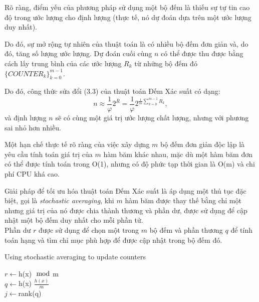 \documentclass[a4paper,13pt]{article}
\theoremstyle{mytheor}
\begin{document}
Rõ ràng, điểm yếu của phương pháp sử dụng một bộ đếm là thiếu sự tự tin cao độ trong ước lượng cho định lượng (thực tế, nó dự đoán dựa trên một ước lượng 
duy nhất).

Do đó, sự mở rộng tự nhiên của thuật toán là có nhiều bộ đếm đơn giản và, do đó, tăng số lượng ước lượng. Dự đoán cuối cùng $n$ có thể được thu được 
bằng cách lấy trung bình của các ước lượng $R_k$ từ những bộ đếm đó $\{COUNTER_k\}_{k=0}^{m-1}$.

Do đó, công thức sửa đổi (3.3) của thuật toán Đếm Xác suất có dạng:
\[
    n \approx \frac{1}{\varphi}2^{\bar{R}} = \frac{1}{\varphi}2^{\frac{1}{m}{\sum\limits_{k=0}^{m-1}R_k}},
\]
và định lượng $n$ sẽ có cùng một giá trị ước lượng chất lượng, nhưng với phương sai nhỏ hơn nhiều.

Một hạn chế thực tế rõ ràng của việc xây dựng $m$ bộ đếm đơn giản độc lập là yêu cầu tính toán giá trị của $m$ hàm băm khác nhau, mặc dù một 
hàm băm đơn có thể được tính toán trong O(1), nhưng có độ phức tạp thời gian là O(m) và chi phí CPU khá cao.

Giải pháp để tối ưu hóa thuật toán Đếm Xác suất là áp dụng một thủ tục đặc biệt, gọi là \textit{stochastic averaging}, khi $m$ hàm băm được thay thế 
bằng chỉ một nhưng giá trị của nó được chia thành thương và phần dư, được sử dụng để cập nhật một bộ đếm duy nhất cho mỗi phần tử. \\
Phần dư $r$ được sử dụng để chọn một trong $m$ bộ đếm và phần thương $q$ để tính toán hạng và tìm chỉ mục phù hợp để được cập nhật trong bộ đếm đó. \\
\begin{algorithm}[H]
    \DontPrintSemicolon
    \LinesNumberedHidden
    \caption[]{Using stochastic averaging to update counters}
    $r\gets$h(x)$\mod$m\\
    $q \gets $h(x)  $\frac{h(x)}{m}$\\ %
    $j \gets $rank(q)\\
\end{algorithm}
\end{document}
